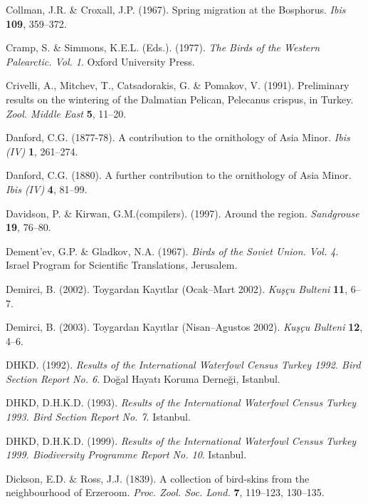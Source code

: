 \documentclass[
  a4paper,
  DIV=11,
  numbers=noendperiod]{scrreprt}
\newlength{\cslhangindent}
\newenvironment{CSLReferences}[2] %
 {\begin{list}{}{%
  \setlength{\itemindent}{0pt}
  \setlength{\leftmargin}{0pt}
  \setlength{\parsep}{0pt}
  \ifodd #1
   \setlength{\leftmargin}{\cslhangindent}
   \setlength{\itemindent}{-1\cslhangindent}
  \fi
  \setlength{\itemsep}{#2\baselineskip}}}
 {\end{list}}
\begin{document}
\begin{CSLReferences}{1}{1}
Collman, J.R. \& Croxall, J.P. (1967). {Spring migration at the
Bosphorus}. \emph{Ibis} \textbf{109}, 359--372.

Cramp, S. \& Simmons, K.E.L. (Eds.). (1977). \emph{{The Birds of the
Western Palearctic. Vol. 1}}. Oxford University Press.

Crivelli, A., Mitchev, T., Catsadorakis, G. \& Pomakov, V. (1991).
{Preliminary results on the wintering of the Dalmatian Pelican,
Pelecanus crispus, in Turkey}. \emph{Zool. Middle East} \textbf{5},
11--20.

Danford, C.G. (1877-78). {A contribution to the ornithology of Asia
Minor}. \emph{Ibis (IV)} \textbf{1}, 261--274.

Danford, C.G. (1880). {A further contribution to the ornithology of Asia
Minor}. \emph{Ibis (IV)} \textbf{4}, 81--99.

Davidson, P. \& Kirwan, G.M.(compilers). (1997). {Around the region}.
\emph{Sandgrouse} \textbf{19}, 76--80.

Dement'ev, G.P. \& Gladkov, N.A. (1967). \emph{{Birds of the Soviet
Union. Vol. 4}}. Israel Program for Scientific Translations, Jerusalem.

Demirci, B. (2002). {Toygardan Kayıtlar (Ocak--Mart 2002)}. \emph{Kuşçu
Bulteni} \textbf{11}, 6--7.

Demirci, B. (2003). {Toygardan Kayıtlar (Nisan--Agustos 2002)}.
\emph{Kuşçu Bulteni} \textbf{12}, 4--6.

DHKD. (1992). \emph{{Results of the International Waterfowl Census
Turkey 1992. Bird Section Report No. 6}}. Doğal Hayatı Koruma Derneği,
Istanbul.

DHKD, D.H.K.D. (1993). \emph{{Results of the International Waterfowl
Census Turkey 1993. Bird Section Report No. 7}}. Istanbul.

DHKD, D.H.K.D. (1999). \emph{{Results of the International Waterfowl
Census Turkey 1999. Biodiversity Programme Report No. 10}}. Istanbul.

Dickson, E.D. \& Ross, J.J. (1839). {A collection of bird-skins from the
neighbourhood of Erzeroom}. \emph{Proc. Zool. Soc. Lond.} \textbf{7},
119--123, 130--135.


\end{CSLReferences}
\end{document}
